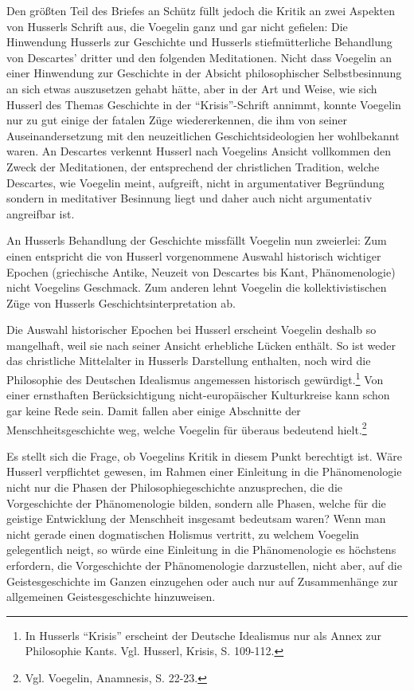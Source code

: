 Den größten Teil des Briefes an Schütz füllt jedoch die Kritik an zwei
Aspekten von Husserls Schrift aus, die Voegelin ganz und gar nicht gefielen:
Die Hinwendung Husserls zur Geschichte und Husserls stiefmütterliche
Behandlung von Descartes' dritter und den folgenden Meditationen. Nicht dass
Voegelin an einer Hinwendung zur Geschichte in der Absicht philosophischer
Selbstbesinnung an sich etwas auszusetzen gehabt hätte, aber in der Art und
Weise, wie sich Husserl des Themas Geschichte in der "`Krisis"'-Schrift
annimmt, konnte Voegelin nur zu gut einige der fatalen Züge wiedererkennen,
die ihm von seiner Auseinandersetzung mit den neuzeitlichen
Geschichtsideologien her wohlbekannt waren. An Descartes verkennt Husserl
nach Voegelins Ansicht vollkommen den Zweck der Meditationen, der
entsprechend der christlichen Tradition, welche Descartes, wie Voegelin meint,
aufgreift, nicht in argumentativer Begründung sondern in meditativer
Besinnung liegt und daher auch nicht argumentativ angreifbar ist.

An Husserls Behandlung der Geschichte missfällt Voegelin nun zweierlei: Zum
einen entspricht die von Husserl vorgenommene Auswahl historisch wichtiger
Epochen (griechische Antike, Neuzeit von Descartes bis Kant, Phänomenologie)
nicht Voegelins Geschmack. Zum anderen lehnt Voegelin die kollektivistischen
Züge von Husserls Geschichtsinterpretation ab.

Die Auswahl historischer Epochen bei Husserl erscheint Voegelin deshalb so
mangelhaft, weil sie nach seiner Ansicht erhebliche Lücken enthält. So ist
weder das christliche Mittelalter in Husserls Darstellung enthalten, noch wird
die Philosophie des Deutschen Idealismus angemessen historisch
gewürdigt.\footnote{In Husserls "`Krisis"' erscheint der Deutsche Idealismus
  nur als Annex zur Philosophie Kants. Vgl. Husserl, Krisis, S. 109-112.} Von
einer ernsthaften Berücksichtigung nicht-europäischer Kulturkreise kann schon
gar keine Rede sein. Damit fallen aber einige Abschnitte der
Menschheitsgeschichte weg, welche Voegelin für überaus bedeutend
hielt.\footnote{Vgl. Voegelin, Anamnesis, S. 22-23.}

Es stellt sich die Frage, ob Voegelins Kritik in diesem Punkt berechtigt ist.
Wäre Husserl verpflichtet gewesen, im Rahmen einer Einleitung in die
Phänomenologie nicht nur die Phasen der Philosophiegeschichte anzusprechen,
die die Vorgeschichte der Phänomenologie bilden, sondern alle Phasen, welche
für die geistige Entwicklung der Menschheit insgesamt bedeutsam waren? Wenn
man nicht gerade einen dogmatischen Holismus vertritt, zu welchem Voegelin
gelegentlich neigt, so würde eine Einleitung in die Phänomenologie es
höchstens erfordern, die Vorgeschichte der Phänomenologie darzustellen, nicht
aber, auf die Geistesgeschichte im Ganzen einzugehen oder auch nur auf
Zusammenhänge zur allgemeinen Geistesgeschichte hinzuweisen.


